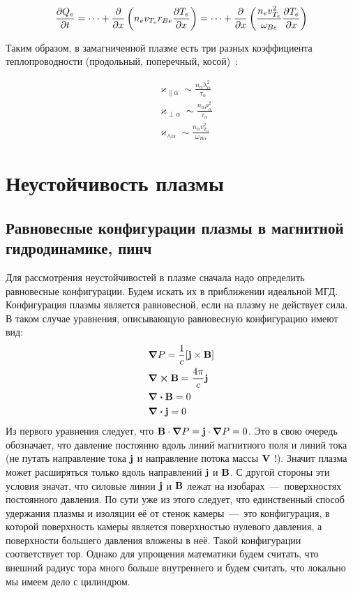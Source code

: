 \documentclass[10pt, a4paper]{article}
\let\stdsection\section
\renewcommand\section{\newpage\stdsection}
\begin{document}
\begin{equation*}
	\pdv{Q_e}{t} = \dots + \pdv{}{x}\left( n_e v_{T_e} r_{Be} \pdv{T_e}{x} \right) = \dots + \pdv{}{x}\left(\frac{n_e v_{T_e}^2}{\omega_{Be}}\pdv{T_e}{x} \right)
\end{equation*}

Таким образом, в замагниченной плазме есть три разных коэффициента теплопроводности (продольный, поперечный, косой)~\cite{kotelnikov}:

\begin{align*}
	&\varkappa_{\parallel\alpha} \sim \frac{n_\alpha \lambda_\alpha^2}{\tau_\alpha} \\
	&\varkappa_{\perp\alpha} \sim \frac{n_\alpha \rho_\alpha^2}{\tau_\alpha} \\
	&\varkappa_{\wedge\alpha} \sim \frac{n_\alpha v_{T_\alpha}^2}{\omega_{B\alpha}}
\end{align*}

\section{Неустойчивость плазмы}

\subsection{Равновесные конфигурации плазмы в магнитной гидродинамике, пинч}

Для рассмотрения неустойчивостей в плазме сначала надо определить равновесные конфигурации. Будем искать их в приближении идеальной МГД. Конфигурация плазмы является равновесной, если на плазму не действует сила. В таком случае уравнения, описывающую равновесную конфигурацию имеют вид:
\begin{align*}
	&\grad{P} = \frac{1}{c}[\vb{j}\times\vb{B}] \\
	&\curl\vb{B} = \frac{4\pi}{c}\vb{j} \\
	&\div{\vb{B}} = 0 \\
	&\div{\vb{j}} = 0
\end{align*}
Из первого уравнения следует, что $\vb{B}\cdot\grad{P} = \vb{j}\cdot\grad{P} = 0$. Это в свою очередь обозначает, что давление постоянно вдоль линий магнитного поля и линий тока (не путать направление тока $\vb{j}$ и направление потока массы $\vb{V}$ !). Значит плазма может расширяться только вдоль направлений $\vb{j}$ и $\vb{B}$. С другой стороны эти условия значат, что силовые линии $\vb{j}$ и $\vb{B}$ лежат на изобарах~---~поверхностях постоянного давления. По сути уже из этого следует, что единственный способ удержания плазмы и изоляции её от стенок камеры~---~это конфигурация, в которой поверхность камеры является поверхностью нулевого давления, а поверхности большего давления вложены в неё. Такой конфигурации соответствует тор. Однако для упрощения математики будем считать, что внешний радиус тора много больше внутреннего и будем считать, что локально мы имеем дело с цилиндром.
\end{document}
